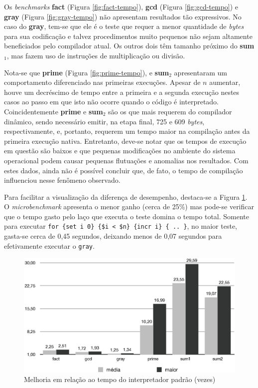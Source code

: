 Os \textit{benchmarks} \textbf{fact} (Figura \ref{fig:fact-tempo}),
\textbf{gcd} (Figura \ref{fig:gcd-tempo}) e \textbf{gray} (Figura
\ref{fig:gray-tempo}) não apresentam resultados tão expressivos. No
caso do \textbf{gray}, tem-se que ele é o teste que requer a menor
quantidade de \textit{bytes} para sua codificação e talvez
procedimentos muito pequenos não sejam altamente beneficiados pelo
compilador atual. Os outros dois têm tamanho próximo do
\textbf{sum$_1$}, mas fazem uso de instruções de multiplicação ou
divisão.

Nota-se que \textbf{prime} (Figura \ref{fig:prime-tempo}),
e \textbf{sum$_2$} apresentaram um comportamento
diferenciado nas primeiras execuções. Apesar de $n$ aumentar,
houve um decréscimo de tempo entre a primeira e a segunda
execução nestes casos ao passo em que isto não ocorre quando o código é
interpretado.
Coincidentemente \textbf{prime} e \textbf{sum$_2$} são os que
mais requerem do compilador dinâmico, sendo necessário emitir, na
etapa final, 725 e 609
\textit{bytes}, respectivamente, e, portanto, requerem um tempo maior
na compilação antes da primeira execução nativa. Entretanto, deve-se
notar que os tempos de execução em questão são baixos e que pequenas
modificações no ambiente do sistema operacional podem causar pequenas
flutuações e anomalias nos resultados. Com estes dados, ainda não é
possível concluir que, de fato, o tempo de compilação influenciou
nesse fenômeno observado.




Para facilitar a visualização da diferença de desempenho,
destaca-se a Figura \ref{fig:media-tempo}. O \textit{microbenchmark}
apresenta o menor ganho (cerca de 25\%) mas pode-se verificar que o
tempo gasto pelo laço que
executa o teste domina o tempo total. Somente para executar
\verb!for {set i 0} {$i < $n} {incr i} { .. }!, no maior
teste, gasta-se cerca
de 0,45 segundos, deixando menos de 0,07 segundos para efetivamente
executar o \verb!gray!.

\begin{figure}[ht]
  \centering
  \includegraphics[scale=0.70]{figs/melhoria}
  \caption{Melhoria em relação ao tempo do interpretador padrão (vezes) \label{fig:media-tempo}}
\end{figure}

